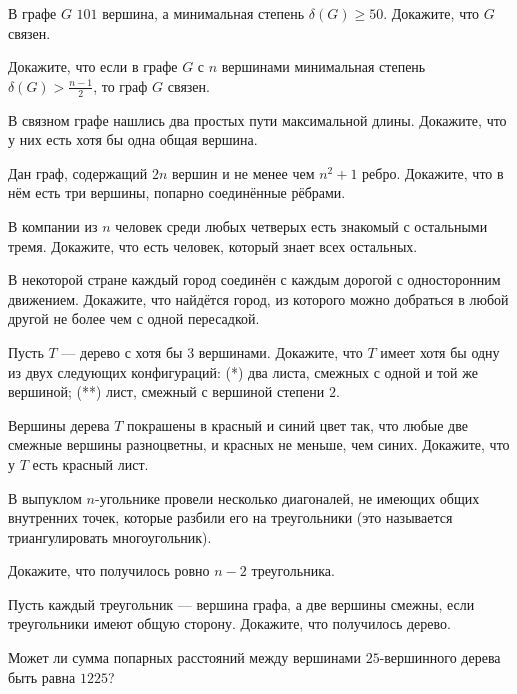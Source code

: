 \begin{problems}
\item В графе $G$ $101$ вершина, а минимальная степень $\delta(G)\ge50$. Докажите, что $G$ связен.

\item Докажите, что если в графе $G$ с $n$ вершинами минимальная степень $\delta(G)>\frac{n-1}{2}$, то граф $G$ связен.

\item В связном графе нашлись два простых пути максимальной длины. Докажите, что у них есть хотя бы одна общая вершина.

\item Дан граф, содержащий $2n$ вершин и не менее чем $n^2+1$ ребро. Докажите, что в нём есть три вершины, попарно соединённые рёбрами.

\item В компании из $n$ человек среди любых четверых есть знакомый с остальными тремя. Докажите, что есть человек, который знает всех остальных.

\item В некоторой стране каждый город соединён с каждым дорогой с односторонним движением. Докажите, что найдётся город, из которого можно добраться в любой другой не более чем с одной пересадкой.

\item Пусть $T$ --- дерево с хотя бы $3$ вершинами. Докажите, что $T$ имеет хотя бы одну из двух следующих конфигураций: (*) два листа, смежных с одной и той же вершиной; (**) лист, смежный с вершиной степени $2$.

\item Вершины дерева $T$ покрашены в красный и синий цвет так, что любые две смежные вершины разноцветны, и красных не меньше, чем синих. Докажите, что у $T$ есть красный лист.

\item В выпуклом $n$-угольнике провели несколько диагоналей, не имеющих общих внутренних точек, которые разбили его на треугольники (это называется триангулировать многоугольник).
\begin{parts}
  \item Докажите, что получилось ровно $n-2$ треугольника.
  \item Пусть каждый треугольник --- вершина графа, а две вершины смежны, если треугольники имеют общую сторону. Докажите, что получилось дерево.
\end{parts}

\item Может ли сумма попарных расстояний между вершинами $25$-вершинного дерева быть равна $1225$?


\end{problems}
